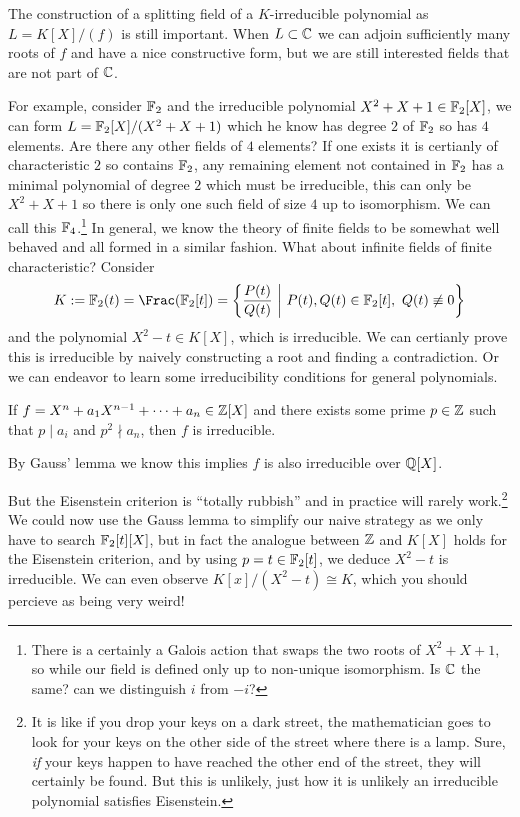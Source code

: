 \documentclass{article}
\begin{document}
The construction of a splitting field of a $K$-irreducible polynomial as $L=K[X]/(f)$ is still important. When $L\subset \mathbb{C}$ we can adjoin sufficiently many roots of $f$ and have a nice constructive form, but we are still interested fields that are not part of $\mathbb{C}$.

For example, consider $\mathbb{F}_2$ and the irreducible polynomial $X^2+X+1\in\mathbb{F}_2[X]$, we can form $L = \mathbb{F}_2[X]/(X^2+X+1)$ which he know has degree $2$ of $\mathbb{F}_2$ so has $4$ elements. Are there any other fields of $4$ elements? If one exists it is certianly of characteristic $2$ so contains $\mathbb{F}_2$, any remaining element not contained in $\mathbb{F}_2$ has a minimal polynomial of degree $2$ which must be irreducible, this can only be $X^2+X+1$ so there is only one such field of size $4$ up to isomorphism. We can call this $\mathbb{F}_4$.\footnote{There is a certainly a Galois action that swaps the two roots of $X^2+X+1$, so while our field is defined only up to non-unique isomorphism. Is $\mathbb{C}$ the same? can we distinguish $i$ from $-i$?} In general, we know the theory of finite fields to be somewhat well behaved and all formed in a similar fashion. What about infinite fields of finite characteristic? Consider \[
    K := \bF_2(t) = \Frac(\bF_2[t]) = \left\{ \frac{P(t)}{Q(t)} \ \middle| \ P(t),Q(t)\in \bF_2[t], \ Q(t)\not\equiv 0\right\}
\] and the polynomial $X^2-t\in K[X]$, which is irreducible. We can certianly prove this is irreducible by naively constructing a root and finding a contradiction. Or we can endeavor to learn some irreducibility conditions for general polynomials.

\begin{proposition}
    If $f = X^n + a_1X^{n-1} + \cdots + a_n \in \mathbb{Z}[X]$ and there exists some prime $p\in \mathbb{Z}$ such that $p\mid a_i$ and $p^2 \nmid a_n$, then $f$ is irreducible.
\end{proposition}

\begin{corollary}
    By Gauss' lemma we know this implies $f$ is also irreducible over $\mathbb{Q}[X]$.
\end{corollary}

But the Eisenstein criterion is ``totally rubbish'' and in practice will rarely work.\footnote{It is like if you drop your keys on a dark street, the mathematician goes to look for your keys on the other side of the street where there is a lamp. Sure, \textit{if} your keys happen to have reached the other end of the street, they will certainly be found. But this is unlikely, just how it is unlikely an irreducible polynomial satisfies Eisenstein.} We could now use the Gauss lemma to simplify our naive strategy as we only have to search $\mathbb{F}_2[t][X]$, but in fact the analogue between $\mathbb{Z}$ and $K[X]$ holds for the Eisenstein criterion, and by using $p=t\in\mathbb{F}_2[t]$, we deduce $X^2-t$ is irreducible. We can even observe $K[x]/(X^2-t)\cong K$, which you should percieve as being very weird!
\end{document}
